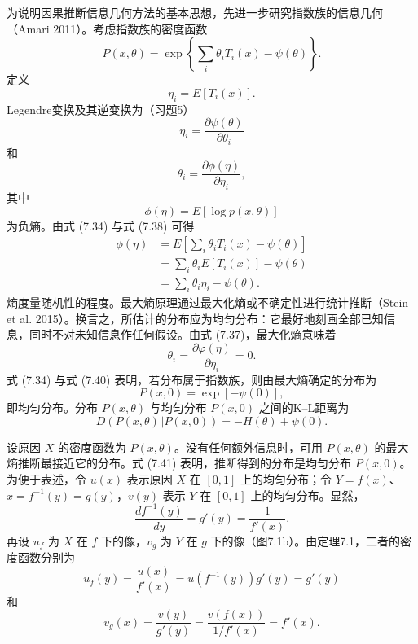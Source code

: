 为说明因果推断信息几何方法的基本思想，先进一步研究指数族的信息几何（Amari 2011）。考虑指数族的密度函数
\begin{equation}
P(x,\theta)=\exp\left\{\sum_i\theta_iT_i(x)-\psi(\theta)\right\}.
\tag{7.34}
\end{equation}
定义
\begin{equation}
\eta_i=E[T_i(x)].
\tag{7.35}
\end{equation}
Legendre变换及其逆变换为（习题5）
\begin{equation}
\eta_i=\frac{\partial\psi(\theta)}{\partial\theta_i}
\tag{7.36}
\end{equation}
和
\begin{equation}
\theta_i=\frac{\partial\phi(\eta)}{\partial\eta_i},
\tag{7.37}
\end{equation}
其中
\begin{equation}
\phi(\eta)=E[\log p(x,\theta)]
\tag{7.38}
\end{equation}
为负熵。由式 (7.34) 与式 (7.38) 可得
\begin{equation}
\begin{aligned}
\phi(\eta)&=E\left[\sum_i\theta_iT_i(x)-\psi(\theta)\right]\\
&=\sum_i\theta_iE[T_i(x)]-\psi(\theta)\\
&=\sum_i\theta_i\eta_i-\psi(\theta).
\end{aligned}
\tag{7.39}
\end{equation}
熵度量随机性的程度。最大熵原理通过最大化熵或不确定性进行统计推断（Stein et al. 2015）。换言之，所估计的分布应为均匀分布：它最好地刻画全部已知信息，同时不对未知信息作任何假设。由式 (7.37)，最大化熵意味着
\begin{equation}
\theta_i=\frac{\partial\varphi(\eta)}{\partial\eta_i}=0.
\tag{7.40}
\end{equation}
式 (7.34) 与式 (7.40) 表明，若分布属于指数族，则由最大熵确定的分布为
\begin{equation}
P(x,0)=\exp[-\psi(0)],
\tag{7.41}
\end{equation}
即均匀分布。分布 $P(x,\theta)$ 与均匀分布 $P(x,0)$ 之间的K–L距离为
\begin{equation}
D(P(x,\theta)\Vert P(x,0))=-H(\theta)+\psi(0).
\tag{7.42}
\end{equation}

设原因 $X$ 的密度函数为 $P(x,\theta)$。没有任何额外信息时，可用 $P(x,\theta)$ 的最大熵推断最接近它的分布。式 (7.41) 表明，推断得到的分布是均匀分布 $P(x,0)$。为便于表述，令 $u(x)$ 表示原因 $X$ 在 $[0,1]$ 上的均匀分布；令 $Y=f(x)$、$x=f^{-1}(y)=g(y)$，$v(y)$ 表示 $Y$ 在 $[0,1]$ 上的均匀分布。显然，
\[
\frac{df^{-1}(y)}{dy}=g'(y)=\frac1{f'(x)}.
\]
再设 $u_f$ 为 $X$ 在 $f$ 下的像，$v_g$ 为 $Y$ 在 $g$ 下的像（图7.1b）。由定理7.1，二者的密度函数分别为
\begin{equation}
u_f(y)=\frac{u(x)}{f'(x)}=u(f^{-1}(y))g'(y)=g'(y)
\tag{7.43}
\end{equation}
和
\begin{equation}
v_g(x)=\frac{v(y)}{g'(y)}=\frac{v(f(x))}{1/f'(x)}=f'(x).
\tag{7.44}
\end{equation}


